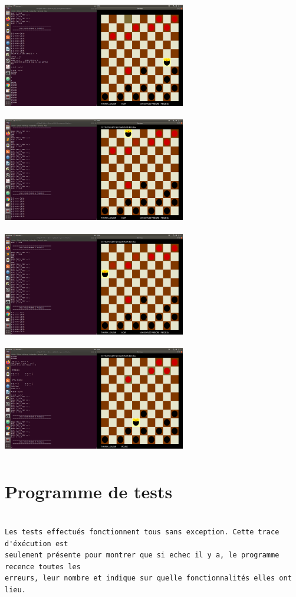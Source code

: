 \documentclass[a4paper]{article}
\begin{document}
\includegraphics[width = 8cm, height = 5cm]{rafle3-1.png}
\includegraphics[width = 8cm, height = 5cm]{rafle3-2.png}
\bigbreak
\includegraphics[width = 8cm, height = 5cm]{rafle3-3.png}
\includegraphics[width = 8cm, height = 5cm]{rafle3-4.png}

\section{Programme de tests}

\begin{verbatim}

Les tests effectués fonctionnent tous sans exception. Cette trace d'éxécution est 
seulement présente pour montrer que si echec il y a, le programme recence toutes les 
erreurs, leur nombre et indique sur quelle fonctionnalités elles ont lieu.

\end{verbatim}
\end{document}
